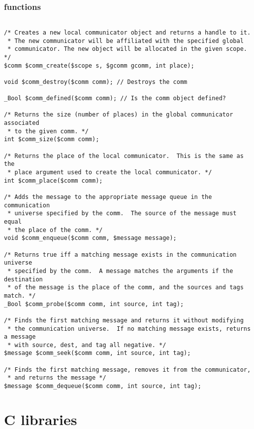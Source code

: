 \subsubsection{\ccomm{} functions}
\label{subsubsec:comm}

\begin{verbatim}

/* Creates a new local communicator object and returns a handle to it.
 * The new communicator will be affiliated with the specified global
 * communicator. The new object will be allocated in the given scope. */
$comm $comm_create($scope s, $gcomm gcomm, int place);

void $comm_destroy($comm comm); // Destroys the comm

_Bool $comm_defined($comm comm); // Is the comm object defined?

/* Returns the size (number of places) in the global communicator associated
 * to the given comm. */
int $comm_size($comm comm);

/* Returns the place of the local communicator.  This is the same as the
 * place argument used to create the local communicator. */
int $comm_place($comm comm);

/* Adds the message to the appropriate message queue in the communication
 * universe specified by the comm.  The source of the message must equal
 * the place of the comm. */
void $comm_enqueue($comm comm, $message message);

/* Returns true iff a matching message exists in the communication universe
 * specified by the comm.  A message matches the arguments if the destination
 * of the message is the place of the comm, and the sources and tags match. */
_Bool $comm_probe($comm comm, int source, int tag);

/* Finds the first matching message and returns it without modifying
 * the communication universe.  If no matching message exists, returns a message
 * with source, dest, and tag all negative. */
$message $comm_seek($comm comm, int source, int tag);

/* Finds the first matching message, removes it from the communicator,
 * and returns the message */ 
$message $comm_dequeue($comm comm, int source, int tag);
\end{verbatim}

\section{C libraries}

